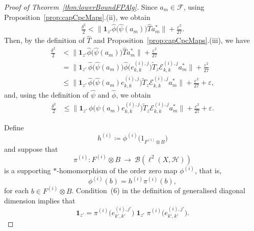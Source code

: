 \documentclass[a4paper]{amsart}
\newcommand{\myhyp}{\textnormal{-}\hskip0pt\relax}
\numberwithin{equation}{section}
\newcommand{\Bcal}{\mathcal{B}}
\newcommand{\Ecal}{\mathcal{E}}
\newcommand{\Fcal}{\mathcal{F}}
\newcommand{\Hcal}{\mathcal{H}}
\newcommand{\e}{\varepsilon}
\newcommand{\indF}{\mathbf{1}}
\newcommand{\bop}[1]{\Bcal({#1})}
\newcommand{\rAr}{\longrightarrow}
\newcommand{\normBig}[1]{{\Big\lVert #1 \Big \rVert}}
\newcommand{\unMatImg}[3]{{\Ecal_{#3}^{(#1), #2}}}
\theoremstyle{plain}
\theoremstyle{indented}
\numberwithin{equation}{section}
\theoremstyle{definition}
\theoremstyle{remark}
\theoremstyle{plain}
\theoremstyle{definition}
\begin{document}
\begin{proof}[Proof of Theorem~\ref{thm:lowerBoundFPAlg}]
        Since ${a_m \in \Fcal}$, using Proposition~\ref{prop:capCpcMaps}.(ii), we obtain
         \begin{align*}
          \frac{\delta^2}{2}
          < \normBig{\indF_{z'} \widehat{\phi} \big(\widehat{\psi}(a_m) \big)  \widehat{T} a_m^\ast } + \frac{\e^2}{27}.
        \end{align*}
        Then, by the definition of $\widehat{T}$ and Proposition~\ref{prop:capCpcMaps}.(iii), we have
        \begin{align*}
          \frac{\delta^2}{2}
           & < \normBig{\indF_{z'} \widehat{\phi} \big(\widehat{\psi}(a_m) \big)  \widehat{T} a_m^\ast } + \frac{\e^2}{27}\\
           & = \normBig{\indF_{z'}  \, \widehat{\phi} \big(\widehat{\psi}(a_m) \big) \widehat{\phi}\big(e_{k,k}^{(i),j} \big)  \widetilde{T}_{z} \unMatImg{i}{j}{k,k} a_m^\ast} + \frac{\e^2}{27}\\
           & \le \normBig{\indF_{z'} \, \widehat{\phi}\big(\widehat{\psi}(a_m) e_{k,k}^{(i),j} \big)   \widetilde{T}_{z} \unMatImg{i}{j}{k,k} a_m^\ast} + \frac{\e^2}{27} +\e,
        \end{align*}
        and, using the definition of
        $\widehat{\psi}$ and $\widehat{\phi}$,
        we obtain
        \begin{align*}
          \frac{\delta^2}{2}
           & \le   \normBig{\indF_{z'} \, {\phi}\big({\psi}(a_m) e_{k,k}^{(i),j} \big)   \widetilde{T}_{z} \unMatImg{i}{j}{k,k} a_m^\ast} + \frac{\e^2}{27} +\e.
        \end{align*}
  
        Define 
        \[{h^{(i)} \coloneq \phi^{(i)} \big( 1_{F^{(i)} \otimes B} \big)}\]
        and suppose that
         \[\pi^{(i)} \colon F^{(i)} \otimes B~\rAr~ \bop{\ell^2(X,\Hcal)}\]
         is a supporting ${\ast}$\myhyp{}homomorphism of the 
         order zero map $\phi^{(i)}$, that is,
        \[{\phi^{(i)}(b) = h^{(i)} \pi^{(i)}(b)},\]
        for each ${b \in F^{(i)} \otimes B}$.
    Condition~(6) in the definition of generalised diagonal dimension implies that
    \begin{equation*}
        \indF_{z' }= \pi^{(i)}\big(e^{{(i)},{j'}}_{k',k'} \big) \; \indF_{z' } \;\pi^{(i)}\big(e^{{(i)},{j'}}_{k',k'} \big) .
    \end{equation*}


\end{proof}
\end{document}
